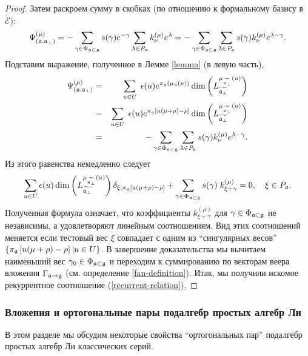 \begin{proof}
Затем раскроем сумму в скобках (по отношению к формальному базису в  $\mathcal{E}$):
\begin{equation*}
\Psi ^{\left( \mu \right) }_{\left(  \af, \afb \right)}
=-\sum_{\gamma \in \Phi _{\af\subset \gf}}s(\gamma
)e^{-\gamma }\sum_{\lambda \in P_{\af}}k_{\nu }^{(\mu )}e^{\lambda
}=-\sum_{\gamma \in \Phi _{\af\subset \gf}}\sum_{\lambda \in P_{%
\af}}s(\gamma )k_{\nu }^{(\mu )}e^{\lambda -\gamma }.
\end{equation*}
Подставим выражение, полученное в Лемме \ref{lemma} (в левую часть),
\begin{eqnarray*}
\Psi ^{\left( \mu \right) }_{\left(  \af, \afb \right)}
&=&\sum_{u\in U}\;\epsilon (u)e^{\pi _{\af}\left( \mu _{\frak{a%
}}\left( u\right) \right) }\dim \left( L_{\widetilde{\af_{\perp }}%
}^{\mu _{\widetilde{\af_{\perp }}}\left( u\right) }\right)
\label{anom modules 2} \\
&=&\sum_{u\in U}\;\epsilon (u)e^{\pi _{\af}\left[ u(\mu +\rho )-\rho %
\right] }\dim \left( L_{\widetilde{\af_{\perp }}}^{\mu _{\widetilde{%
\af_{\perp }}}\left( u\right) }\right)  \\
&=&-\sum_{\gamma \in \Phi _{\af\subset \gf}}\sum_{\lambda \in P_{%
\af}}s(\gamma )k_{\nu }^{(\mu )}e^{\lambda -\gamma }.
\end{eqnarray*}
Из этого равенства немедленно следует
\begin{equation}
\sum_{u\in U}\epsilon (u)\dim \left( L_{\widetilde{\af_{\perp }}}^{\mu
_{\widetilde{\af_{\perp }}}\left( u\right) }\right) \delta _{\xi ,\pi _{%
\af}\left[ u(\mu +\rho )-\rho \right] }+\sum_{\gamma \in \Phi _{\af%
\subset \gf}}s(\gamma )\;k_{\xi +\gamma }^{(\mu )}=0,\quad \xi \in P_{%
\af}.  \label{eq:121}
\end{equation}
Полученная формула означает, что коэффициенты  $k_{\xi +\gamma }^{(\mu )}$ для  $\gamma \in \Phi _{\mathfrak{a}\subset \mathfrak{g}}$ не независимы, а удовлетворяют линейным соотношениям. Вид этих соотношений меняется если тестовый вес  $\xi $ совпадает с одним из ``сингулярных весов''   $\left\{ \pi _{\mathfrak{a}}\left[ u(\mu +\rho )-\rho \right] |u\in U\right\} $. В завершение доказательства мы вычитаем наименьший вес  $\gamma _{0}\in \Phi _{\mathfrak{a}\subset \mathfrak{g}}$ и переходим к суммированию по векторам веера вложения $\Gamma _{\mathfrak{a}\rightarrow \mathfrak{g}}$ (см. определение \ref{fan-definition}). Итак, мы получили искомое рекуррентное соотношение  (\ref{recurrent-relation}).
\end{proof}

\subsubsection{Вложения и ортогональные пары подалгебр простых алгебр Ли}
\label{sect-embeddings}
В этом разделе мы обсудим некоторые свойства ``ортогональных пар'' подалгебр простых алгебр Ли классических серий. 


